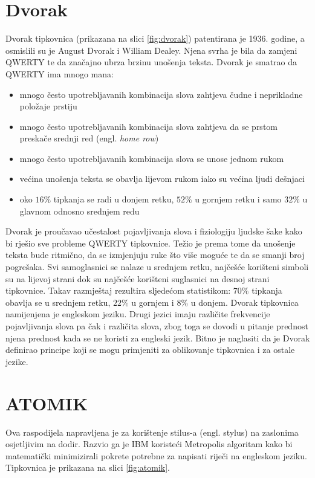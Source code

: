 \documentclass[times, utf8, zavrsni]{fer}
\begin{document}
\section{Dvorak}
Dvorak tipkovnica (prikazana na slici \ref{fig:dvorak}) patentirana je 1936. godine, a osmislili su je August Dvorak i William Dealey. Njena svrha je bila da zamjeni QWERTY te da značajno ubrza brzinu unošenja teksta. Dvorak je smatrao da QWERTY ima mnogo mana:

\begin{itemize}
\item mnogo često upotrebljavanih kombinacija slova zahtjeva čudne i neprikladne položaje prstiju
\item mnogo često upotrebljavanih kombinacija slova zahtjeva da se prstom preskače srednji red (engl. \emph{home row})
\item mnogo često upotrebljavanih kombinacija slova se unose jednom rukom
\item većina unošenja teksta se obavlja lijevom rukom iako su većina ljudi dešnjaci
\item oko $16\%$ tipkanja se radi u donjem retku, $52\%$ u gornjem retku i samo $32\%$ u glavnom odnosno srednjem redu
\end{itemize}

Dvorak je proučavao učestalost pojavljivanja slova i fiziologiju ljudske šake kako bi rješio sve probleme QWERTY tipkovnice. Težio je prema tome da unošenje teksta bude ritmično, da se izmjenjuju ruke što više moguće te da se smanji broj pogrešaka. Svi samoglasnici se nalaze u srednjem retku, najčešće korišteni simboli su na lijevoj strani dok su najčešće korišteni suglasnici na desnoj strani tipkovnice. Takav razmještaj rezultira sljedećom statistikom: $70\%$ tipkanja obavlja se u srednjem retku, $22\%$ u gornjem i $8\%$ u donjem.  Dvorak tipkovnica namijenjena je engleskom jeziku. Drugi jezici imaju različite frekvencije pojavljivanja slova pa čak i različita slova, zbog toga se dovodi u pitanje prednost njena prednost kada se ne koristi za engleski jezik. Bitno je naglasiti da je Dvorak definirao principe koji se mogu primjeniti za oblikovanje tipkovnica i za ostale jezike.

\section{ATOMIK}
Ova raspodijela napravljena je za korištenje stilus-a (engl. stylus) na zaslonima osjetljivim na dodir. Razvio ga je IBM koristeći Metropolis algoritam kako bi matematički minimizirali pokrete potrebne za napisati riječi na engleskom jeziku. Tipkovnica je prikazana na slici \ref{fig:atomik}.
\end{document}
